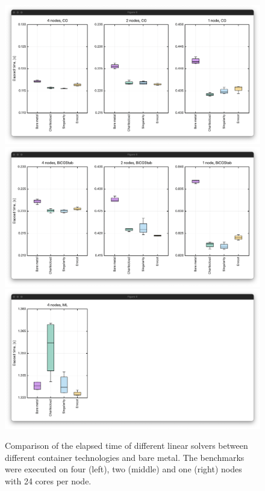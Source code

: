\documentclass[12pt]{article}
\begin{document}
\begin{figure}[H]
\centering
\includegraphics[trim = 40 60 40 60, clip, scale = 0.3]{images/cg.png}
\includegraphics[trim = 40 60 40 60, clip, scale = 0.3]{images/bicgstab.png}
\includegraphics[trim = 40 60 40 60, clip, scale = 0.3]{images/ml.png}
\caption{Comparison of the elapsed time of different linear solvers between different container technologies and bare metal. The benchmarks were executed on four (left), two (middle) and one (right) nodes with 24 cores per node.}
\label{fig:container_benchmarks}
\end{figure}
\end{document}

